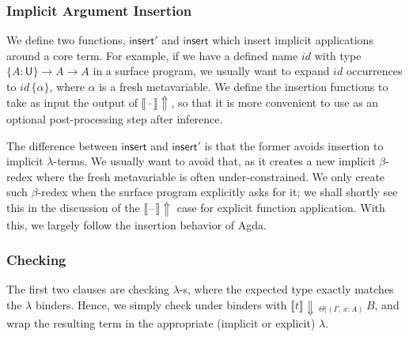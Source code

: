 \documentclass[acmsmall,screen,dvipsnames]{acmart}\settopmatter{}
\renewcommand{\U}{\mathsf{U}}
\newcommand{\blank}{\mathord{\hspace{1pt}\text{--}\hspace{1pt}}}
\newcommand{\einferblank}{\llbracket\blank\rrbracket\!\Uparrow}
\newcommand{\echeck}[4]{\llbracket#1\rrbracket\!\Downarrow\,_{#2|#3}\,#4}
\newcommand{\einsert}{\mathsf{insert}}
\theoremstyle{remark}
\begin{document}
\subsubsection{Implicit Argument Insertion}
We define two functions, $\einsert'$ and $\einsert$ which insert implicit
applications around a core term. For example, if we have a defined name $id$
with type $\{A : \U\}\to A \to A$ in a surface program, we usually want to
expand $id$ occurrences to $id\,\{\alpha\}$, where $\alpha$ is a fresh
metavariable. We define the insertion functions to take as input the output of
$\einferblank$, so that it is more convenient to use as an optional
post-processing step after inference.

The difference between $\einsert$ and $\einsert'$ is that the former avoids
insertion to implicit $\lambda$-terms. We usually want to avoid that, as it
creates a new implicit $\beta$-redex where the fresh metavariable is often
under-constrained. We only create such $\beta$-redex when the surface program
explicitly asks for it; we shall shortly see this in the discussion of the
$\einferblank$ case for explicit function application. With this, we largely
follow the insertion behavior of Agda.

\subsubsection{Checking}
The first two clauses are checking $\lambda$-s, where the expected type exactly
matches the $\lambda$ binders. Hence, we simply check under binders with
$\echeck{t}{\Theta}{(\Gamma,\,x:A)} B$, and wrap the resulting term in the
appropriate (implicit or explicit) $\lambda$.
\end{document}
